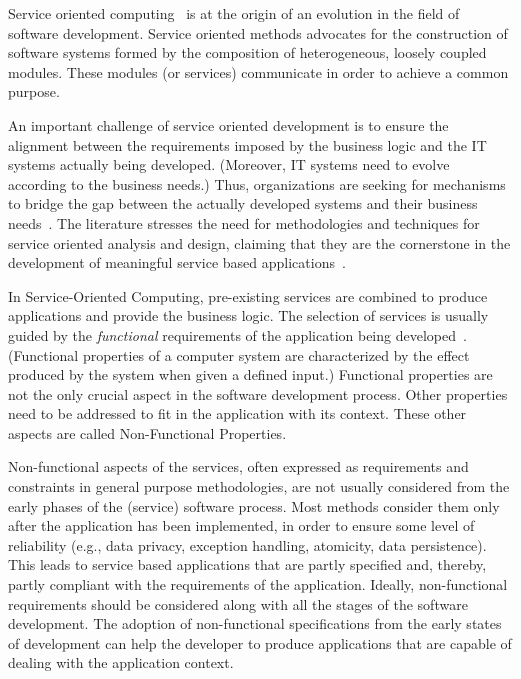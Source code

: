 
Service oriented computing~\cite{Papazoglou2007} is at the origin of an evolution in the field of software development.
Service oriented methods advocates for the construction of software systems formed by the composition of heterogeneous, loosely coupled modules.
These modules (or services) communicate in order to achieve a common purpose.
 
An important challenge of service oriented development is  to ensure the alignment between the requirements imposed by the business logic and the IT systems actually being developed.
(Moreover, IT systems need to evolve according to the business needs.)
Thus, organizations are seeking for mechanisms to bridge the gap between the actually developed systems and their business needs~\cite{bell}. 
The literature stresses the need for methodologies and techniques for service oriented analysis and design, claiming that they are the cornerstone in the development of meaningful service based applications~\cite{5}.  

In Service-Oriented Computing, pre-existing services are
combined to produce applications and provide the business logic. 
The selection of services is usually guided by the \textit{functional} requirements of the application being developed~\cite{1,2,decastro1,PapazoglouH06}. 
(Functional properties of a computer system are characterized by the effect produced by the system when given a defined input.)
Functional properties are not the only crucial aspect in the software development process. 
Other properties need to be addressed to fit in the application with its context.
These other aspects are called Non-Functional Properties.

Non-functional aspects of the services, often expressed as requirements and constraints in general purpose methodologies, are not usually considered from the early phases of the (service) software process.
Most methods consider them only after the application has been implemented, in order to ensure some level of reliability (e.g., data privacy, exception handling, atomicity, data persistence). 
This leads to service based applications that are partly specified and, thereby, partly compliant with the requirements of the application.
Ideally, non-functional requirements should be considered along with all the stages of the software development. 
The adoption of non-functional specifications from the early states of development
can help the developer to produce applications that are capable of dealing with
the application context.

